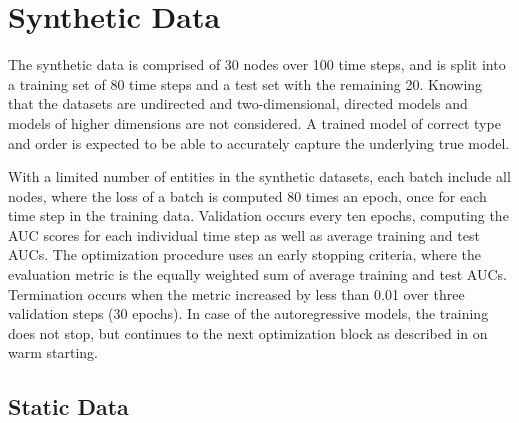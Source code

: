 

\section{Synthetic Data}

The synthetic data is comprised of 30 nodes over 100 time steps, and is split into a training set of 80 time steps and a test set with the remaining 20. Knowing that the datasets are undirected and two-dimensional, directed models and models of higher dimensions are not considered. A trained model of correct type and order is expected to be able to accurately capture the underlying true model.

With a limited number of entities in the synthetic datasets, each batch include all nodes, where the loss of a batch is computed 80 times an epoch, once for each time step in the training data. Validation occurs every ten epochs, computing the AUC scores for each individual time step as well as average training and test AUCs.
The optimization procedure uses an early stopping criteria, where the evaluation metric is the equally weighted sum of average training and test AUCs. Termination occurs when the metric increased by less than 0.01 over three validation steps (30 epochs). In case of the autoregressive models, the training does not stop, but continues to the next optimization block as described in  on warm starting.



\subsection{Static Data}

